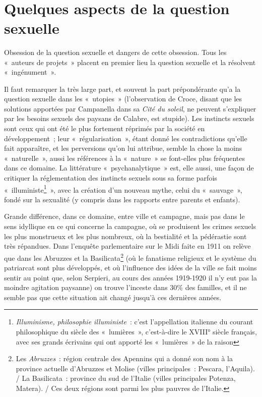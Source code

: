 \documentclass[french,twoside]{book} %
\newcommand\chaptercont{} %
\begin{document}
\chaptercont
\noindent  \par
[Notes extraites du Cahier V écrit en 1934.]\par
\section[{Quelques aspects de la question sexuelle}]{Quelques aspects de la question sexuelle}
\noindent Obsession de la question sexuelle et dangers de cette obsession. Tous les « auteurs de projets » placent en premier lieu la question sexuelle et la résolvent « ingénument ».\par
Il faut remarquer la très large part, et souvent la part prépondérante qu’a la question sexuelle dans les « utopies » (l’observation de Croce, disant que les solutions apportées par Campanella dans sa \emph{Cité du soleil}, ne peuvent s’expliquer par les besoins sexuels des paysans de Calabre, est stupide). Les instincts sexuels sont ceux qui ont été le plus fortement réprimés par la société en développement ; leur « régularisation », étant donné les contradictions qu’elle fait apparaître, et les perversions qu’on lui attribue, semble la chose la moins « naturelle », aussi les références à la « nature » se font-elles plus fréquentes dans ce domaine. La littérature « psychanalytique » est, elle aussi, une façon de critiquer la réglementation des instincts sexuels sous sa forme parfois « illuministe\footnote{\emph{Illuminisme, philosophie illuministe} : c’est l’appellation italienne du courant philosophique du siècle des « lumières », c’est-à-dire le XVIII° siècle français, avec ses grands écrivains qui ont apporté les « lumières » de la raison} », avec la création d’un nouveau mythe, celui du « sauvage », fondé sur la sexualité (y compris dans les rapports entre parents et enfants).\par
Grande différence, dans ce domaine, entre ville et campagne, mais pas dans le sens idyllique en ce qui concerne la campagne, où se produisent les crimes sexuels les plus monstrueux et les plus nombreux, où la bestialité et la pédérastie sont très répandues. Dans l’enquête parlementaire sur le Midi faite en 1911 on relève que dans les Abruzzes et la Basilicata\footnote{Les \emph{Abruzzes} : région centrale des Apennins qui a donné son nom à la province actuelle d’Abruzzes et Molise (villes principales : Pescara, l’Aquila). / La Basilicata : province du sud de l’Italie (villes principales Potenza, Matera). / Ces deux régions sont parmi les plus pauvres de l’Italie.} (où le fanatisme religieux et le système du patriarcat sont plus développés, et où l’influence des idées de la ville se fait moins sentir au point que, selon Serpieri, au cours des années 1919-1920 il n’y eut pas la moindre agitation paysanne) on trouve l’inceste dans 30\% des familles, et il ne semble pas que cette situation ait changé jusqu’à ces dernières années.\par
\end{document}
